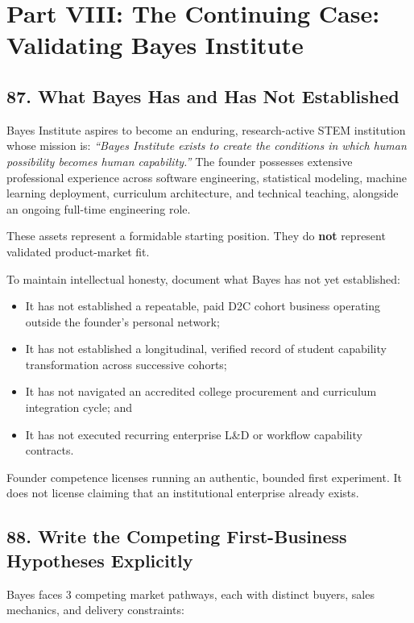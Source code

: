 \section*{Part VIII: The Continuing Case: Validating Bayes Institute}

\subsection*{87. What Bayes Has and Has Not Established}

Bayes Institute aspires to become an enduring, research-active STEM institution whose mission is: \emph{``Bayes Institute exists to create the conditions in which human possibility becomes human capability.''} The founder possesses extensive professional experience across software engineering, statistical modeling, machine learning deployment, curriculum architecture, and technical teaching, alongside an ongoing full-time engineering role.

These assets represent a formidable starting position. They do \textbf{not} represent validated product-market fit.

To maintain intellectual honesty, document what Bayes has not yet established:
\begin{itemize}
    \item It has not established a repeatable, paid D2C cohort business operating outside the founder's personal network;
    \item It has not established a longitudinal, verified record of student capability transformation across successive cohorts;
    \item It has not navigated an accredited college procurement and curriculum integration cycle; and
    \item It has not executed recurring enterprise L\&D or workflow capability contracts.
\end{itemize}

Founder competence licenses running an authentic, bounded first experiment. It does not license claiming that an institutional enterprise already exists.

\subsection*{88. Write the Competing First-Business Hypotheses Explicitly}

Bayes faces 3 competing market pathways, each with distinct buyers, sales mechanics, and delivery constraints:

